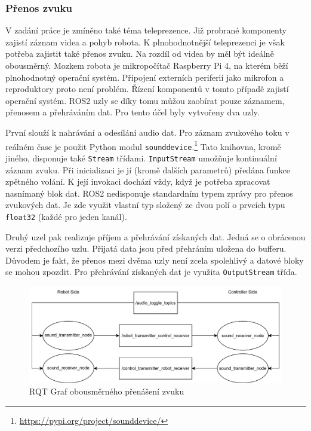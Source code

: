 \subsubsection*{Přenos zvuku}
V zadání práce je zmíněno také téma teleprezence. Již probrané komponenty zajistí záznam videa a pohyb robota. K plnohodnotnější teleprezenci je však potřeba zajistit také přenos zvuku. Na rozdíl od videa by měl být ideálně obousměrný. Mozkem robota je mikropočítač Raspberry Pi 4, na kterém běží plnohodnotný operační systém. Připojení externích periferií jako mikrofon a reproduktory proto není problém. Řízení komponentů v tomto případě zajistí operační systém. ROS2 uzly se díky tomu můžou zaobírat pouze záznamem, přenosem a přehráváním dat. Pro tento účel byly vytvořeny dva uzly.

První slouží k nahrávání a odesílání audio dat. Pro záznam zvukového toku v reálném čase je použit Python modul \verb|sounddevice|.\footnote{\url{https://pypi.org/project/sounddevice/}} Tato knihovna, kromě jiného, disponuje také \verb|Stream| třídami. \verb|InputStream| umožňuje kontinuální záznam zvuku. Při inicializaci je jí (kromě dalších parametrů) předána funkce zpětného volání. K její invokaci dochází vždy, když je potřeba zpracovat nasnímaný blok dat. ROS2 nedisponuje standardním typem zprávy pro přenos zvukových dat. Je zde využit vlastní typ složený ze dvou polí o prvcích typu \verb|float32| (každé pro jeden kanál).

Druhý uzel pak realizuje příjem a přehrávání získaných dat. Jedná se o obrácenou verzi předchozího uzlu. Přijatá data jsou před přehráním uložena do bufferu. Důvodem je fakt, že přenos mezi dvěma uzly není zcela spolehlivý a datové bloky se mohou zpozdit. Pro přehrávání získaných dat je využita \verb|OutputStream| třída.

\begin{figure}[h!]
	\centering
	\includegraphics[scale=0.75]{obrazky-figures/audio_transfer_diagram.pdf}
	\caption{RQT Graf obousměrného přenášení zvuku}
	\label{fig:rqt_sound}
\end{figure}

